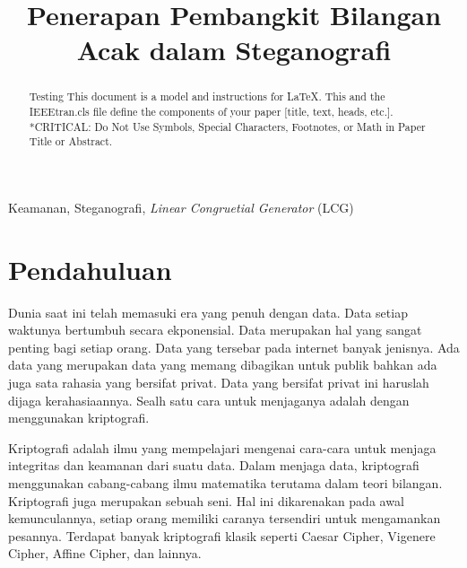 \documentclass[10pt,conference]{IEEEtran}
\theoremstyle{definition}
\begin{document}
\title{Penerapan Pembangkit Bilangan Acak dalam Steganografi}

\author{
}

\maketitle

\begin{abstract}
Testing This document is a model and instructions for \LaTeX.
This and the IEEEtran.cls file define the components of your paper [title, text, heads, etc.]. *CRITICAL: Do Not Use Symbols, Special Characters, Footnotes, 
or Math in Paper Title or Abstract.
\end{abstract}

\begin{IEEEkeywords}
Keamanan, Steganografi, \emph{Linear Congruetial Generator} (LCG)
\end{IEEEkeywords}

\section{Pendahuluan}
Dunia saat ini telah memasuki era yang penuh dengan data. Data setiap waktunya bertumbuh secara ekponensial. 
Data merupakan hal yang sangat penting bagi setiap orang. Data yang tersebar pada internet banyak jenisnya. 
Ada data yang merupakan data yang memang dibagikan untuk publik bahkan ada juga sata rahasia yang bersifat privat. 
Data yang bersifat privat ini haruslah dijaga kerahasiaannya. Sealh satu cara untuk menjaganya adalah dengan menggunakan kriptografi.

Kriptografi adalah ilmu yang mempelajari mengenai cara-cara untuk menjaga integritas dan keamanan dari suatu data.\cite{b1}
Dalam menjaga data, kriptografi menggunakan cabang-cabang ilmu matematika terutama dalam teori bilangan. 
Kriptografi juga merupakan sebuah seni. Hal ini dikarenakan pada awal kemunculannya, setiap orang memiliki 
caranya tersendiri untuk mengamankan pesannya. Terdapat banyak kriptografi klasik seperti Caesar Cipher, 
Vigenere Cipher, Affine Cipher, dan lainnya.
\end{document}
